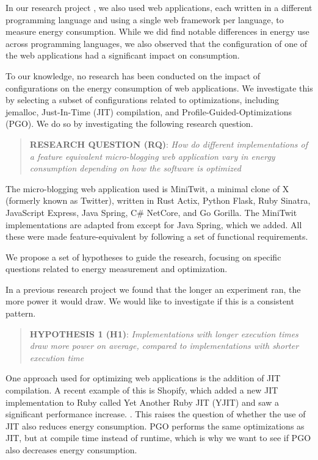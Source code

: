 \documentclass[../main.tex]{subfiles}
\begin{document}
In our research project \cite{Pfeiffer_Offenberg_Pedersen_Landsgaard_Karlsen}, we also used web applications, each written in a different programming language and using a single web framework per language, to measure energy consumption. While we did find notable differences in energy use across programming languages, we also observed that the configuration of one of the web applications had a significant impact on consumption. 

To our knowledge, no research has been conducted on the impact of configurations on the energy consumption of web applications. We investigate this by selecting a subset of configurations related to optimizations, including jemalloc, Just-In-Time (JIT) compilation, and Profile-Guided-Optimizations (PGO). We do so by investigating the following research question.

\begin{quote}
    \textbf{RESEARCH QUESTION (RQ)}: \emph{How do different implementations of a feature equivalent micro-blogging web application vary in energy consumption depending on how the software is optimized}
\end{quote}

The micro-blogging web application used is MiniTwit, a minimal clone of X (formerly known as Twitter\cite{verge-twitter-rebrand-x}), written in Rust Actix, Python Flask, Ruby Sinatra, JavaScript Express, Java Spring, C\# NetCore, and Go Gorilla. The MiniTwit implementations are adapted from \textcite{Pfeiffer_Trindade_Meding_Harwick} except for Java Spring, which we added. All these were made feature-equivalent by following a set of functional requirements.

We propose a set of hypotheses to guide the research, focusing on specific questions related to energy measurement and optimization.

In a previous research project we found that the longer an experiment ran, the more power it would draw. We would like to investigate if this is a consistent pattern.

\begin{quote}
    \textbf{HYPOTHESIS 1 (H1)}: \emph{Implementations with longer execution times draw more power on average, compared to implementations with shorter execution time}
\end{quote}


One approach used for optimizing web applications is the addition of JIT compilation. A recent example of this is Shopify, which added a new JIT implementation to Ruby called Yet Another Ruby JIT (YJIT) and saw a significant performance increase. \cite{shopify-yjit}. This raises the question of whether the use of JIT also reduces energy consumption. PGO performs the same optimizations as JIT, but at compile time instead of runtime, which is why we want to see if PGO also decreases energy consumption.
\end{document}
